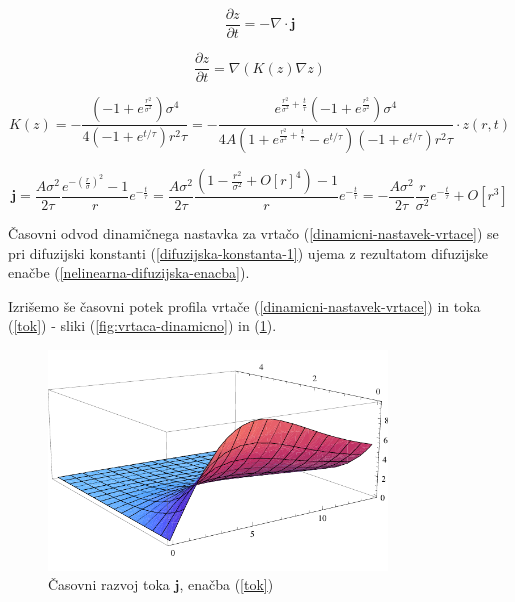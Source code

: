 \documentclass[a4paper, oneside, 12pt]{book}
\begin{document}
\begin{equation}
  \frac{\partial z}{\partial t} = - \nabla \cdot \mathbf{j}
  \label{kontinuitetna-enacba}
\end{equation}

\begin{equation}
  \frac{\partial z}{\partial t} = \nabla (K(z) \nabla z)
  \label{nelinearna-difuzijska-enacba}
\end{equation}

\begin{equation}
  K(z) = -\frac{\left(-1+e^{\frac{r^2}{\sigma ^2}}\right) \sigma ^4}{4 \left(-1+e^{t/\tau }\right) r^2 \tau } = -\frac{e^{\frac{r^2}{\sigma ^2}+\frac{t}{\tau }} \left(-1+e^{\frac{r^2}{\sigma ^2}}\right) \sigma ^4}{4 A \left(1+e^{\frac{r^2}{\sigma ^2}+\frac{t}{\tau }}-e^{t/\tau }\right) \left(-1+e^{t/\tau }\right) r^2 \tau } \cdot z(r,t)
  \label{difuzijska-konstanta-1}
\end{equation}

\begin{equation}
  \mathbf{j} = \frac{A \sigma^2}{2 \tau} \frac{e^{-(\frac{r}{\sigma})^2}-1}{r} e^{-\frac{t}{\tau}} = \frac{A \sigma^2}{2 \tau} \frac{\left( 1-\frac{r^2}{\sigma ^2}+O[r]^4 \right)-1}{r} e^{-\frac{t}{\tau}} = -\frac{A \sigma^2}{2 \tau} \frac{r}{\sigma ^2} e^{-\frac{t}{\tau}} + O[r^3]
  \label{tok}
\end{equation}

Časovni odvod dinamičnega nastavka za vrtačo (\ref{dinamicni-nastavek-vrtace}) se pri difuzijski konstanti (\ref{difuzijska-konstanta-1}) ujema z rezultatom difuzijske enačbe (\ref{nelinearna-difuzijska-enacba}).

Izrišemo še časovni potek profila vrtače (\ref{dinamicni-nastavek-vrtace}) in toka (\ref{tok}) - sliki (\ref{fig:vrtaca-dinamicno}) in (\ref{fig:tok-dinamicno}).

\begin{figure}[H]
  \begin{center}
    \includegraphics[width=9cm]{slike/tok-dinamicno}
  \end{center}
  \caption{Časovni razvoj toka $\mathbf{j}$, enačba (\ref{tok})}
  \label{fig:tok-dinamicno}
\end{figure}
\end{document}
